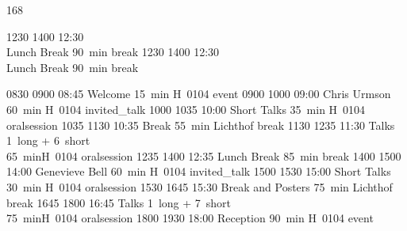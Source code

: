 \setslotsize{3cm}{1.3mm}
 {168}
\settextframe{1.5mm}
\setbottomspace{0pt}
\begin{timetable}

   {1230} {1400} {12:30\\\vspace{0.2em}Lunch Break}         {90~min}                {}                   {break}
   {1230} {1400} {12:30\\\vspace{0.2em}Lunch Break}         {90~min}                {}                   {break}

   {0830} {0900} {08:45 Welcome}                      {\vspace{1.5mm}15~min}          {\vspace{1.5mm}H~0104}        {event}
   {0900} {1000} {09:00 Chris Urmson}                 {60~min}                        {H~0104}                      {invited_talk}
   {1000} {1035} {10:00 Short Talks}                  {\vspace{1.5mm}35~min}          {\vspace{1.5mm}H~0104}        {oralsession}
   {1035} {1130} {10:35 Break}                        {\vspace{1.5mm}55~min}          {\vspace{1.5mm}Lichthof}      {break}
   {1130} {1235} {11:30 Talks}                        {\vspace{-0.5em}1~long + 6~short\\65~min}{H~0104}             {oralsession}
   {1235} {1400} {12:35 Lunch Break}                  {85~min}                        {}                            {break}
   {1400} {1500} {14:00 Genevieve Bell}               {60~min}                        {H~0104}                      {invited_talk}
   {1500} {1530} {15:00 Short Talks} 		      {\vspace{1.5mm}30~min}          {\vspace{1.5mm}H~0104}        {oralsession}
   {1530} {1645} {15:30 Break and Posters}            {\vspace{1.5mm}75~min}          {\vspace{1.5mm}Lichthof}      {break}
   {1645} {1800} {16:45 Talks}                        {\vspace{-0.5em}1~long + 7~short\\75~min}{H~0104}             {oralsession}
   {1800} {1930} {18:00 Reception}  	              {\vspace{1.5mm}90~min}          {\vspace{1.5mm}H~0104}        {event}



\end{timetable}
